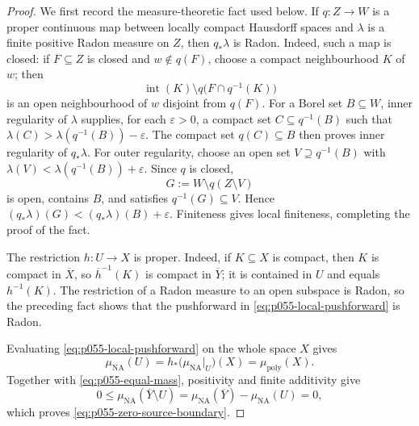 \begin{proof}
We first record the measure-theoretic fact used below.  If
\(q:Z\to W\) is a proper continuous map between locally compact Hausdorff
spaces and \(\lambda\) is a finite positive Radon measure on \(Z\), then
\(q_*\lambda\) is Radon.  Indeed, such a map is closed: if \(F\subseteq Z\)
is closed and \(w\notin q(F)\), choose a compact neighbourhood \(K\) of
\(w\); then
\[
 \operatorname{int}(K)\setminus q\bigl(F\cap q^{-1}(K)\bigr)
\]
is an open neighbourhood of \(w\) disjoint from \(q(F)\).  For a Borel set
\(B\subseteq W\), inner regularity of \(\lambda\) supplies, for each
\(\varepsilon>0\), a compact set \(C\subseteq q^{-1}(B)\) such that
\(\lambda(C)>\lambda(q^{-1}(B))-\varepsilon\).  The compact set
\(q(C)\subseteq B\) then proves inner regularity of \(q_*\lambda\).  For
outer regularity, choose an open set \(V\supseteq q^{-1}(B)\) with
\(\lambda(V)<\lambda(q^{-1}(B))+\varepsilon\).  Since \(q\) is closed,
\[
 G:=W\setminus q(Z\setminus V)
\]
is open, contains \(B\), and satisfies \(q^{-1}(G)\subseteq V\).  Hence
\((q_*\lambda)(G)<(q_*\lambda)(B)+\varepsilon\).  Finiteness gives local
finiteness, completing the proof of the fact.

The restriction \(h:U\to X\) is proper.  Indeed, if \(K\subseteq X\) is
compact, then \(K\) is compact in \(\overline X\), so
\(\overline h^{-1}(K)\) is compact in \(\overline Y\); it is contained in
\(U\) and equals \(h^{-1}(K)\).  The restriction of a Radon measure to an
open subspace is Radon, so the preceding fact shows that the pushforward in
\eqref{eq:p055-local-pushforward} is Radon.

Evaluating \eqref{eq:p055-local-pushforward} on the whole space \(X\) gives
\[
 \mu_{\mathrm{NA}}(U)
 =h_*\bigl(\mu_{\mathrm{NA}}|_U\bigr)(X)
 =\mu_{\mathrm{poly}}(X).
\]
Together with \eqref{eq:p055-equal-mass}, positivity and finite additivity
give
\[
 0\leq\mu_{\mathrm{NA}}(\overline Y\setminus U)
 =\mu_{\mathrm{NA}}(\overline Y)-\mu_{\mathrm{NA}}(U)=0,
\]
which proves \eqref{eq:p055-zero-source-boundary}.


\end{proof}
